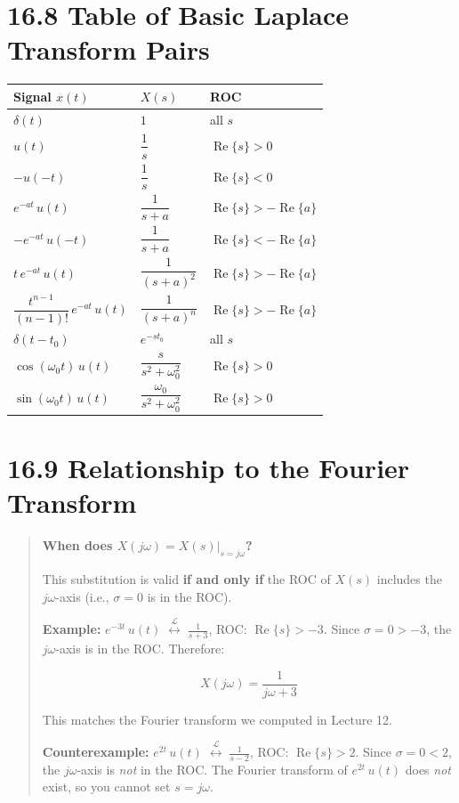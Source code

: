 \documentclass[11pt]{article}
\begin{document}
\section*{16.8 Table of Basic Laplace Transform Pairs}

\begin{center}
\begin{tabular}{|l|l|l|}
\hline
\textbf{Signal $x(t)$} & \textbf{$X(s)$} & \textbf{ROC} \\
\hline
$\delta(t)$ & $1$ & all $s$ \\
\hline
$u(t)$ & $\dfrac{1}{s}$ & $\operatorname{Re}\{s\} > 0$ \\
\hline
$-u(-t)$ & $\dfrac{1}{s}$ & $\operatorname{Re}\{s\} < 0$ \\
\hline
$e^{-at}\,u(t)$ & $\dfrac{1}{s+a}$ & $\operatorname{Re}\{s\} > -\operatorname{Re}\{a\}$ \\
\hline
$-e^{-at}\,u(-t)$ & $\dfrac{1}{s+a}$ & $\operatorname{Re}\{s\} < -\operatorname{Re}\{a\}$ \\
\hline
$t\,e^{-at}\,u(t)$ & $\dfrac{1}{(s+a)^2}$ & $\operatorname{Re}\{s\} > -\operatorname{Re}\{a\}$ \\
\hline
$\dfrac{t^{n-1}}{(n-1)!}\,e^{-at}\,u(t)$ & $\dfrac{1}{(s+a)^n}$ & $\operatorname{Re}\{s\} > -\operatorname{Re}\{a\}$ \\
\hline
$\delta(t - t_0)$ & $e^{-st_0}$ & all $s$ \\
\hline
$\cos(\omega_0 t)\,u(t)$ & $\dfrac{s}{s^2 + \omega_0^2}$ & $\operatorname{Re}\{s\} > 0$ \\
\hline
$\sin(\omega_0 t)\,u(t)$ & $\dfrac{\omega_0}{s^2 + \omega_0^2}$ & $\operatorname{Re}\{s\} > 0$ \\
\hline
\end{tabular}
\end{center}

\section*{16.9 Relationship to the Fourier Transform}

\begin{quote}
\textbf{When does $X(j\omega) = X(s)\big|_{s=j\omega}$?}

This substitution is valid \textbf{if and only if} the ROC of $X(s)$ includes the $j\omega$-axis (i.e., $\sigma = 0$ is in the ROC).

\textbf{Example:} $e^{-3t}\,u(t) \;\overset{\mathcal{L}}{\longleftrightarrow}\; \frac{1}{s+3}$, ROC: $\operatorname{Re}\{s\} > -3$.
Since $\sigma = 0 > -3$, the $j\omega$-axis is in the ROC. Therefore:

\[X(j\omega) = \frac{1}{j\omega + 3}\]

This matches the Fourier transform we computed in Lecture 12.

\textbf{Counterexample:} $e^{2t}\,u(t) \;\overset{\mathcal{L}}{\longleftrightarrow}\; \frac{1}{s-2}$, ROC: $\operatorname{Re}\{s\} > 2$.
Since $\sigma = 0 < 2$, the $j\omega$-axis is \textit{not} in the ROC. The Fourier transform of $e^{2t}\,u(t)$ does \textit{not} exist, so you cannot set $s = j\omega$.
\end{quote}
\end{document}

